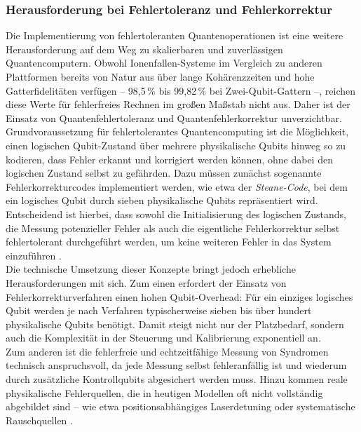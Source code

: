 \subsubsection{Herausforderung bei Fehlertoleranz und Fehlerkorrektur}
Die Implementierung von fehlertoleranten Quantenoperationen ist eine weitere Herausforderung auf dem Weg zu skalierbaren und zuverlässigen Quantencomputern. Obwohl Ionenfallen-Systeme im Vergleich zu anderen Plattformen bereits von Natur aus über lange Kohärenzzeiten und hohe Gatterfidelitäten verfügen – 98{,}5\,\% bis 99{,}82\,\% bei Zwei-Qubit-Gattern \cite{strohm2024} –, reichen diese Werte für fehlerfreies Rechnen im großen Maßstab nicht aus. Daher ist der Einsatz von Quantenfehlertoleranz und Quantenfehlerkorrektur unverzichtbar. \\

Grundvoraussetzung für fehlertolerantes Quantencomputing ist die Möglichkeit, einen logischen Qubit-Zustand über mehrere physikalische Qubits hinweg so zu kodieren, dass Fehler erkannt und korrigiert werden können, ohne dabei den logischen Zustand selbst zu gefährden. Dazu müssen zunächst sogenannte Fehlerkorrekturcodes implementiert werden, wie etwa der \textit{Steane-Code}, bei dem ein logisches Qubit durch sieben physikalische Qubits repräsentiert wird. Entscheidend ist hierbei, dass sowohl die Initialisierung des logischen Zustands, die Messung potenzieller Fehler als auch die eigentliche Fehlerkorrektur selbst fehlertolerant durchgeführt werden, um keine weiteren Fehler in das System einzuführen \cite{strohm2024}. \\

Die technische Umsetzung dieser Konzepte bringt jedoch erhebliche Herausforderungen mit sich. Zum einen erfordert der Einsatz von Fehlerkorrekturverfahren einen hohen Qubit-Overhead: Für ein einziges logisches Qubit werden je nach Verfahren typischerweise sieben bis über hundert physikalische Qubits benötigt. Damit steigt nicht nur der Platzbedarf, sondern auch die Komplexität in der Steuerung und Kalibrierung exponentiell an. \\

Zum anderen ist die fehlerfreie und echtzeitfähige Messung von Syndromen technisch anspruchsvoll, da jede Messung selbst fehleranfällig ist und wiederum durch zusätzliche Kontrollqubits abgesichert werden muss. Hinzu kommen reale physikalische Fehlerquellen, die in heutigen Modellen oft nicht vollständig abgebildet sind – wie etwa positionsabhängiges Laserdetuning oder systematische Rauschquellen \cite{strohm2024}. \\

